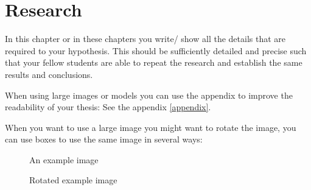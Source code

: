 \chapter{Research}\label{research}
In this chapter or in these chapters you write/ show all the details that are required to  your hypothesis. This should be sufficiently detailed and precise such that your fellow students are able to repeat the research and establish the same results and conclusions. 

When using large images or models you can use the appendix to improve the readability of your thesis: See the appendix \ref{appendix}. 

When you want to use a large image you might want to rotate the image, you can use boxes to use the same image in several ways:

\newsavebox{\BoxName}

\begin{figure}[H]
    \centerline{\resizebox{\textwidth}{!}{\usebox{\BoxName}}}
    \caption{An example image}
    \label{fig:example_image}
\end{figure}

\begin{figure}
\centerline{\resizebox{!}{0.7\textheight}{\usebox{\BoxName}}}
\caption{Rotated example image}
\label{fig:rotated_image}
\end{figure}